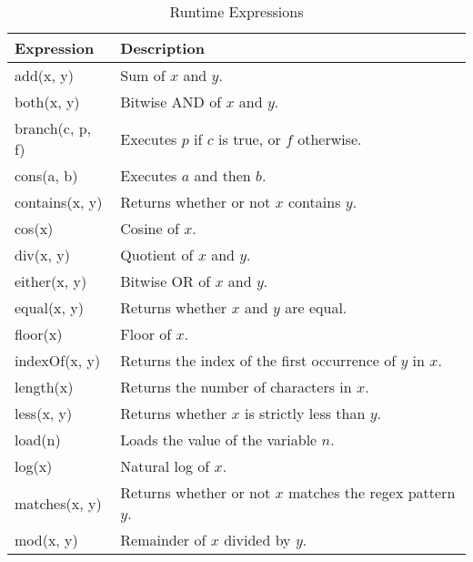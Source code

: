 \documentclass[12pt]{article}
\begin{document}
\appendix
\begin{table}[ht]
\caption{Runtime Expressions}
\centering
\begin{tabular}{l | l}
\hline\hline
Expression & Description                                                                          \\
\hline
add(x, y)                & Sum of $x$ and $y$.                                                    \\
both(x, y)               & Bitwise AND of $x$ and $y$.                                            \\
branch(c, p, f)          & Executes $p$ if $c$ is true, or $f$ otherwise.                         \\
cons(a, b)               & Executes $a$ and then $b$.                                             \\
contains(x, y)           & Returns whether or not $x$ contains $y$.                               \\
cos(x)                   & Cosine of $x$.                                                         \\
div(x, y)                & Quotient of $x$ and $y$.                                               \\
either(x, y)             & Bitwise OR of $x$ and $y$.                                             \\
equal(x, y)              & Returns whether $x$ and $y$ are equal.                                 \\
floor(x)                 & Floor of $x$.                                                          \\
indexOf(x, y)            & Returns the index of the first occurrence of $y$ in $x$.               \\
length(x)                & Returns the number of characters in $x$.                               \\
less(x, y)               & Returns whether $x$ is strictly less than $y$.                         \\
load(n)                  & Loads the value of the variable $n$.                                   \\
log(x)                   & Natural log of $x$.                                                    \\
matches(x, y)            & Returns whether or not $x$ matches the regex pattern $y$.              \\
mod(x, y)                & Remainder of $x$ divided by $y$.                                       \\

\end{tabular}
\end{table}
\end{document}

